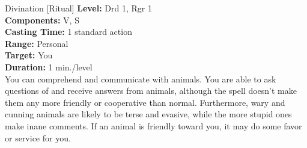 {Divination [Ritual]}
{
	\textbf{Level:}
	Drd 1, Rgr 1\\
	\textbf{Components:}
	V, S\\
	\textbf{Casting Time:}
	1 standard action\\
	\textbf{Range:}
	Personal\\
	\textbf{Target:}
	You\\
	\textbf{Duration:}
	1 min./level\\
}
{
	You can comprehend and communicate with animals. You are able to ask questions of and receive answers from animals, although the spell doesn't make them any more friendly or cooperative than normal. Furthermore, wary and cunning animals are likely to be terse and evasive, while the more stupid ones make inane comments. If an animal is friendly toward you, it may do some favor or service for you.
}
